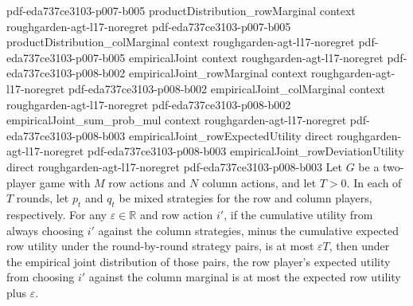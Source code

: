 \begin{lemma}
  {pdf-eda737ce3103-p007-b005}
\proofstep
  {productDistribution_rowMarginal}
  {context}
  {roughgarden-agt-l17-noregret}
  {pdf-eda737ce3103-p007-b005}
\proofstep
  {productDistribution_colMarginal}
  {context}
  {roughgarden-agt-l17-noregret}
  {pdf-eda737ce3103-p007-b005}
\proofstep
  {empiricalJoint}
  {context}
  {roughgarden-agt-l17-noregret}
  {pdf-eda737ce3103-p008-b002}
\proofstep
  {empiricalJoint_rowMarginal}
  {context}
  {roughgarden-agt-l17-noregret}
  {pdf-eda737ce3103-p008-b002}
\proofstep
  {empiricalJoint_colMarginal}
  {context}
  {roughgarden-agt-l17-noregret}
  {pdf-eda737ce3103-p008-b002}
\proofstep
  {empiricalJoint_sum_prob_mul}
  {context}
  {roughgarden-agt-l17-noregret}
  {pdf-eda737ce3103-p008-b003}
\proofstep
  {empiricalJoint_rowExpectedUtility}
  {direct}
  {roughgarden-agt-l17-noregret}
  {pdf-eda737ce3103-p008-b003}
\proofstep
  {empiricalJoint_rowDeviationUtility}
  {direct}
  {roughgarden-agt-l17-noregret}
  {pdf-eda737ce3103-p008-b003}
Let $G$ be a two-player game with $M$ row actions and $N$ column actions, and let $T>0$.
In each of $T$ rounds, let $p_t$ and $q_t$ be mixed strategies for the row and column
players, respectively. For any $\varepsilon\in\mathbb{R}$ and row action $i'$, if the
cumulative utility from always choosing $i'$ against the column strategies, minus the
cumulative expected row utility under the round-by-round strategy pairs, is at most
$\varepsilon T$, then under the empirical joint distribution of those pairs, the row
player's expected utility from choosing $i'$ against the column marginal is at most the
expected row utility plus $\varepsilon$.
\end{lemma}

